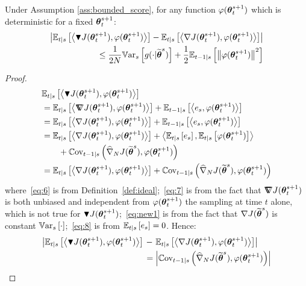 \begin{lemma}\label{lemma:aux0}
	Under Assumption \ref{ass:bounded_score}, for any function $\varphi(\vtheta_t^{s+1})$ which is deterministic for a fixed $\vtheta_t^{s+1}$:
	\begin{align*}
	\left|\Ets[t]{\dotprod{\gradBlack{\vtheta_t^{s+1}}}{\varphi(\vtheta_t^{s+1})}}
	-\Ets{\dotprod{\gradJ{\vtheta_t^{s+1}}}{\varphi(\vtheta_t^{s+1})}}
	\right| \\
	\leq
	\frac{1}{2N}\Vars{g(\cdot\vert\wt{\vtheta}^s)} +\frac{1}{2}\Ets[t-1]{\norm[]{\varphi(\vtheta_t^{s+1})}^2}
	\end{align*}
\end{lemma}
\begin{proof}
	\begin{align}
	&\Ets{\dotprod{\gradBlack{\vtheta_t^{s+1}}}{\varphi(\vtheta_t^{s+1})}}\\
	&=\Ets{\dotprod{\gradIdeal{\vtheta_t^{s+1}}}{\varphi(\vtheta_t^{s+1})}} 
	+ \Ets[t-1]{\dotprod{e_s}{\varphi(\vtheta_t^{s+1})}} \label{eq:6}\\
	&=\Ets{\dotprod{\gradJ{\vtheta_t^{s+1}}}{\varphi(\vtheta_t^{s+1})}} 
	+ \Ets[t-1]{\dotprod{e_s}{\varphi(\vtheta_t^{s+1})}} \label{eq:7}\\
	&= \Ets{\dotprod{\gradJ{\vtheta_t^{s+1}}}{\varphi(\vtheta_t^{s+1})}} 
	+\dotprod{\Ets{e_s}}{\Ets{\varphi(\vtheta_t^{s+1})}}\nonumber\\
	&\qquad+\Covts[t-1]{\gradApp{\wt{\vtheta}^s}{N}}{\varphi(\vtheta_t^{s+1})}  \label{eq:new1}\\
	&= 
	\Ets{\dotprod{\gradJ{\vtheta_t^{s+1}}}{\varphi(\vtheta_t^{s+1})}} +
	\Covts[t-1]{\gradApp{\wt{\vtheta}^s}{N}}{\varphi(\vtheta_t^{s+1})} \label{eq:8}
	\end{align}
	where~\eqref{eq:6} is from Definition~\ref{def:ideal};~\eqref{eq:7} is from the fact that $\gradIdeal{\vtheta_t^{s+1}}$ is both unbiased and independent from $\varphi(\vtheta_t^{s+1})$ \wrt the sampling at time $t$ alone, which is not true for $\gradBlack{\vtheta_t^{s+1}}$;~\eqref{eq:new1} is from the fact that $\gradJ{\wt{\vtheta}^s}$ is constant \wrt $\Vars{\cdot}$;~\eqref{eq:8} is from $\Ets{e_s}=0$.
	Hence:
	\begin{align}
	\left|\Ets{\dotprod{\gradBlack{\vtheta_t^{s+1}}}{\varphi(\vtheta_t^{s+1})}}
	\right.&-\left.\Ets{\dotprod{\gradJ{\vtheta_t^{s+1}}}{\varphi(\vtheta_t^{s+1})}}\right|  \\
	&=
	\left|\Covts[t-1]{\gradApp{\wt{\vtheta}^s}{N}}{\varphi(\vtheta_t^{s+1})}\right|  
	\nonumber\\

\end{align}
\end{proof}

